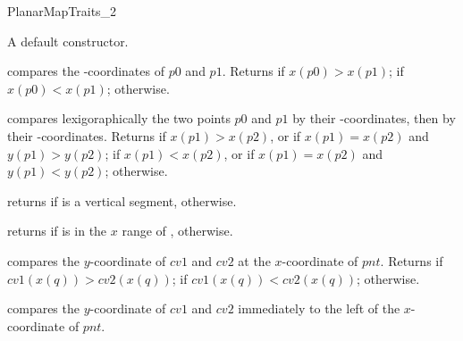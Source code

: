 \begin{ccRefConcept}{PlanarMapTraits_2}

    {A default constructor.}

    \ccOperations

    {compares the -coordinates of $p0$ and $p1$.  Returns
     if $x(p0) > x(p1)$;  if $x(p0) < x(p1)$;
     otherwise.}
    
    {compares lexigoraphically the two points $p0$ and $p1$ by their
    -coordinates, then by their -coordinates.
    Returns  if $x(p1) > x(p2)$, or if
                        $x(p1) = x(p2)$ and $y(p1) > y(p2)$; 
     if $x(p1) < x(p2)$, or if $x(p1) = x(p2)$ and
                      $y(p1) < y(p2)$;
     otherwise.}

   {returns  if  is a vertical segment, 
     otherwise.}
        
    {returns  if  is in the $x$ range of
    ,  otherwise.}
    
    {compares the $y$-coordinate of $cv1$ and $cv2$ at the $x$-coordinate 
    of $pnt$. Returns  if $cv1(x(q)) > cv2(x(q))$;
     if $cv1(x(q)) < cv2(x(q))$;  otherwise.
    }

    {compares the $y$-coordinate of $cv1$ and $cv2$ immediately to the
     left of the $x$-coordinate of $pnt$.
     }
    

\end{ccRefConcept}
